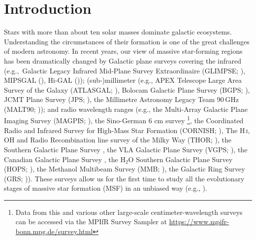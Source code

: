 \documentclass{aa}
\DeclareRobustCommand{\ion}[2]{\textup{#1\,\textsc{\lowercase{#2}}}}
\begin{document}
\section{Introduction}
%
Stars with more than about ten solar masses dominate galactic ecosystems. Understanding the circumstances
of their formation is one of the great challenges of modern astronomy.  In recent years, our view of
massive star-forming regions has been dramatically  changed by Galactic plane surveys covering  the infrared (e.g.,\ Galactic Legacy Infrared Mid-Plane Survey Extraordinaire (GLIMPSE; \citealp{churchwell2009}), MIPSGAL (\citealp{carey2009}), Hi-GAL (\citealp{Molinari2010})); (sub-)millimeter (e.g., APEX Telescope Large Area Survey of the Galaxy (ATLASGAL; \citealp{SchullerMenten:2009aa,csengeri2014}), Bolocam Galactic Plane Survey (BGPS; \citealp{ref-bgps}), JCMT Plane Survey (JPS; \citealp{moore2015,Eden2017}), the Millimetre Astronomy Legacy Team 90\,GHz  (MALT90; \citealt{jackson2013})); and radio wavelength ranges  (e.g., the Multi-Array Galactic Plane Imaging Survey (MAGPIS; \citealp{Becker1990, becker1994}), the Sino-German 6 cm survey \citep{Han2015}\footnote{Data from this and various other large-scale centimeter-wavelength surveys can be accessed via the MPIfR  Survey Sampler at \url{https://www.mpifr-bonn.mpg.de/survey.html}}, the Coordinated Radio and Infrared Survey for High-Mass Star Formation (CORNISH; \citealt{HoarePurcellChurchwell2012, PurcellHoareCotton2013}), The \ion{H}{i}, OH and Radio Recombination line survey of the Milky Way (THOR; \citealt{thor2016,Wang2020}), the Southern Galactic Plane Survey \citep{McClure2005}, the VLA Galactic Plane Survey (VGPS; \citealt{Stil2006}), the Canadian Galactic Plane Survey \citep{Taylor2003}, the H$_2$O Southern Galactic Plane Survey (HOPS; \citealt{hops2011}), the Methanol Multibeam Survey (MMB; \citealt{GreenCaswellFuller2009}), the Galactic Ring Survey (GRS; \citealt{Jackson_2006})). These surveys allow us for the first time to study {all} the evolutionary stages of massive star formation (MSF) in an unbiased way (e.g., \citealt{koenig2017, elia2017, UrquhartKonig:2018aa}).
\end{document}
